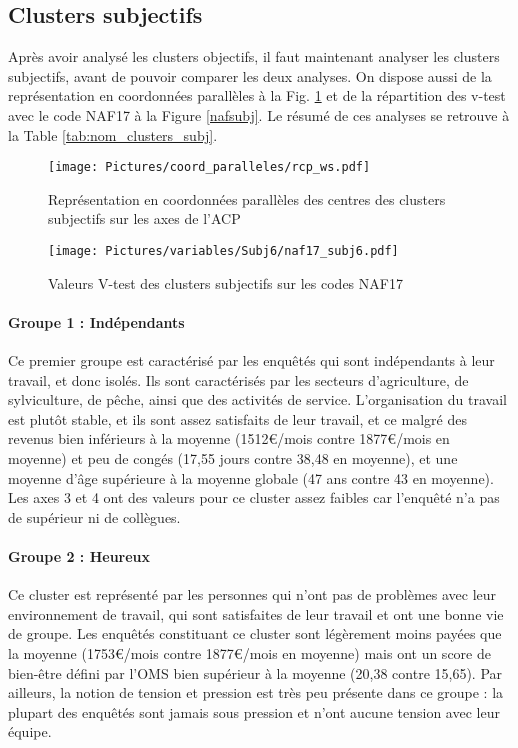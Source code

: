 \documentclass[11pt,fleqn,a4paper,openany,frenchb]{book} %
\begin{document}
\subsection{Clusters subjectifs }

Après avoir analysé les clusters objectifs, il faut maintenant analyser les clusters subjectifs, avant de pouvoir comparer les deux analyses. On dispose aussi de la représentation en coordonnées parallèles à la Fig. \ref{fig:CPsubj} et de la répartition des v-test avec le code NAF17 à la Figure \ref{nafsubj}. Le résumé de ces analyses se retrouve à la Table \ref{tab:nom_clusters_subj}.

\begin{figure}[!h]
\centering
  \texttt{[image: Pictures/coord\_paralleles/rcp\_ws.pdf]}
\caption{Représentation en coordonnées parallèles des centres des clusters subjectifs sur les axes de l'ACP}
\label{fig:CPsubj}
\end{figure}

\begin{figure}[!h]
\centering
  \texttt{[image: Pictures/variables/Subj6/naf17\_subj6.pdf]}
\caption{Valeurs V-test des clusters subjectifs sur les codes NAF17}
\label{fig:nafsubj}
\end{figure}

\paragraph{Groupe 1 : Indépendants\\}
Ce premier groupe est caractérisé par les enquêtés qui sont indépendants à leur travail, et donc isolés. Ils sont caractérisés par les secteurs d'agriculture,  de sylviculture, de pêche, ainsi que des activités de service. L'organisation du travail est plutôt stable, et ils sont assez satisfaits de leur travail, et ce malgré des revenus bien inférieurs à la moyenne (1512\euro{}/mois contre 1877\euro{}/mois en moyenne) et peu de congés (17,55 jours contre 38,48 en moyenne), et une moyenne d'âge supérieure à la moyenne globale (47 ans contre 43 en moyenne). Les axes 3 et 4 ont des valeurs pour ce cluster assez faibles car l'enquêté n'a pas de supérieur ni de collègues.

\paragraph{Groupe 2 : Heureux\\}
Ce cluster est représenté par les personnes qui n'ont pas de problèmes avec leur environnement de travail, qui sont satisfaites de leur travail et ont une bonne vie de groupe. Les enquêtés constituant ce cluster sont légèrement moins payées que la moyenne (1753\euro{}/mois contre 1877\euro{}/mois en moyenne) mais ont un score de bien-être défini par l'OMS bien supérieur à la moyenne (20,38 contre 15,65). Par ailleurs, la notion de tension et pression est très peu présente dans ce groupe : la plupart des enquêtés sont jamais sous pression et n'ont aucune tension avec leur équipe.
\end{document}
